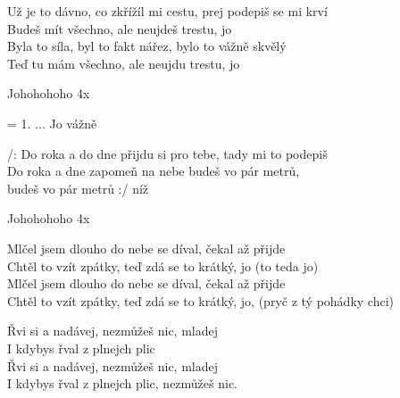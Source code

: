 
\ve{}
Už je to dávno, co zkřížíl mi cestu, prej podepiš se mi krví\\
Budeš mít všechno, ale neujdeš trestu, jo\\
Byla to síla, byl to fakt nářez, bylo to vážně skvělý\\
Teď tu mám všechno, ale neujdu trestu, jo

\re{*:}
Johohohoho 4x

\ve{} = 1.
... Jo vážně

/: Do roka a do dne přijdu si pro tebe, tady mi to podepiš\\
Do roka a dne zapomeň na nebe budeš vo pár metrů,\\
budeš vo pár metrů :/ níž

\re{*:}
Johohohoho 4x

\ve{}
Mlčel jsem dlouho do nebe se díval, čekal až přijde\\
Chtěl to vzít zpátky, teď zdá se to krátký, jo (to teda jo)\\
Mlčel jsem dlouho do nebe se díval, čekal až přijde\\
Chtěl to vzít zpátky, teď zdá se to krátký, jo, (pryč z tý pohádky chci)


Řvi si a nadávej, nezmůžeš nic, mladej\\
I kdybys řval z plnejch plic\\
Řvi si a nadávej, nezmůžeš nic, mladej\\
I kdybys řval z plnejch plic, nezmůžeš nic.

\esong{}